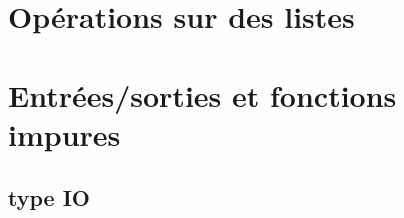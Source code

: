 \section{ Opérations sur des listes}

\section{ Entrées/sorties et fonctions impures}

\subsection{ type IO}
